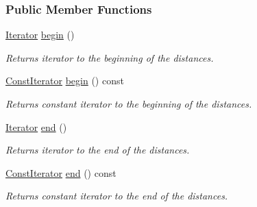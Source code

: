 \subsubsection*{Public Member Functions}
\begin{DoxyCompactItemize}
\item 
\hyperlink{structslb_1_1ext_1_1heuristic_1_1differential_1_1DistanceMap_3_01State_00_01Index_00_01IndexKind_1_1withInverse_01_4_a35bf95bb4cb402c465bc2512c360efc3}{Iterator} \hyperlink{structslb_1_1ext_1_1heuristic_1_1differential_1_1DistanceMap_3_01State_00_01Index_00_01IndexKind_1_1withInverse_01_4_a74e76bf197c77a72949e7fa837f0ab89}{begin} ()
\begin{DoxyCompactList}\small\item\em Returns iterator to the beginning of the distances. \end{DoxyCompactList}\item 
\hyperlink{structslb_1_1ext_1_1heuristic_1_1differential_1_1DistanceMap_3_01State_00_01Index_00_01IndexKind_1_1withInverse_01_4_ac2abc8b528a584f7a26b7e31fec60f7a}{Const\+Iterator} \hyperlink{structslb_1_1ext_1_1heuristic_1_1differential_1_1DistanceMap_3_01State_00_01Index_00_01IndexKind_1_1withInverse_01_4_a6097346ad9934b5dd878ae49b152e743}{begin} () const 
\begin{DoxyCompactList}\small\item\em Returns constant iterator to the beginning of the distances. \end{DoxyCompactList}\item 
\hyperlink{structslb_1_1ext_1_1heuristic_1_1differential_1_1DistanceMap_3_01State_00_01Index_00_01IndexKind_1_1withInverse_01_4_a35bf95bb4cb402c465bc2512c360efc3}{Iterator} \hyperlink{structslb_1_1ext_1_1heuristic_1_1differential_1_1DistanceMap_3_01State_00_01Index_00_01IndexKind_1_1withInverse_01_4_aa0f1ad0419b0ac53ce9a98c35c53d188}{end} ()
\begin{DoxyCompactList}\small\item\em Returns iterator to the end of the distances. \end{DoxyCompactList}\item 
\hyperlink{structslb_1_1ext_1_1heuristic_1_1differential_1_1DistanceMap_3_01State_00_01Index_00_01IndexKind_1_1withInverse_01_4_ac2abc8b528a584f7a26b7e31fec60f7a}{Const\+Iterator} \hyperlink{structslb_1_1ext_1_1heuristic_1_1differential_1_1DistanceMap_3_01State_00_01Index_00_01IndexKind_1_1withInverse_01_4_a3cf9aef634a0a1c7a78e9fd9ccf326e8}{end} () const 
\begin{DoxyCompactList}\small\item\em Returns constant iterator to the end of the distances. \end{DoxyCompactList}\item 

\end{DoxyCompactItemize}
